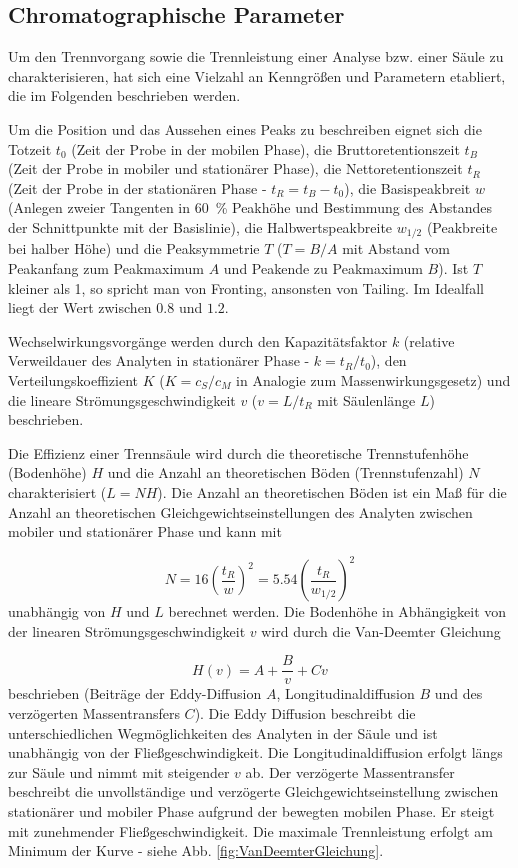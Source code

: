   \subsection{Chromatographische Parameter}
    
    Um den Trennvorgang sowie die Trennleistung einer Analyse bzw. einer Säule zu charakterisieren, hat sich eine Vielzahl an Kenngrößen und Parametern etabliert, die im Folgenden beschrieben werden.
    
    Um die Position und das Aussehen eines Peaks zu beschreiben eignet sich die Totzeit $t_0$ (Zeit der Probe in der mobilen Phase), die Bruttoretentionszeit $t_B$ (Zeit der Probe in mobiler und stationärer Phase), die Nettoretentionszeit $t_R$ (Zeit der Probe in der stationären Phase - $t_R = t_B - t_0$), die Basispeakbreit $w$ (Anlegen zweier Tangenten in \SI[mode=text]{60}{\percent} Peakhöhe und Bestimmung des Abstandes der Schnittpunkte mit der Basislinie), die Halbwertspeakbreite $w_{1/2}$ (Peakbreite bei halber Höhe) und die Peaksymmetrie $T$ ($T = B / A$ mit Abstand vom Peakanfang zum Peakmaximum $A$ und Peakende zu Peakmaximum $B$). Ist $T$ kleiner als 1, so spricht man von Fronting, ansonsten von Tailing. Im Idealfall liegt der Wert zwischen $0.8$ und $1.2$. 
    
    Wechselwirkungsvorgänge werden durch den Kapazitätsfaktor $k$ (relative Verweildauer des Analyten in stationärer Phase - $k = t_R / t_0$), den Verteilungskoeffizient $K$ ($K = c_S / c_M$ in Analogie zum Massenwirkungsgesetz) und die lineare Strömungsgeschwindigkeit $v$ ($v = L / t_R$ mit Säulenlänge $L$) beschrieben. 
    
    Die Effizienz einer Trennsäule wird durch die theoretische Trennstufenhöhe (Bodenhöhe) $H$ und die Anzahl an theoretischen Böden (Trennstufenzahl) $N$ charakterisiert ($L = N H$). Die Anzahl an theoretischen Böden ist ein Maß für die Anzahl an theoretischen Gleichgewichtseinstellungen des Analyten zwischen mobiler und stationärer Phase und kann mit 
    
      \begin{equation}
        N = 16 \left(\frac{t_R}{w}\right)^2 = 5.54 \left(\frac{t_R}{w_{1/2}}\right)^2
      \end{equation} 
    unabhängig von $H$ und $L$ berechnet werden. Die Bodenhöhe in Abhängigkeit von der linearen Strömungsgeschwindigkeit $v$ wird durch die Van-Deemter Gleichung 
    
      \begin{equation}
        H(v) = A + \frac{B}{v} + C v
      \end{equation}
    beschrieben (Beiträge der Eddy-Diffusion $A$, Longitudinaldiffusion $B$ und des verzögerten Massentransfers $C$). Die Eddy Diffusion beschreibt die unterschiedlichen Wegmöglichkeiten des Analyten in der Säule und ist unabhängig von der Fließgeschwindigkeit. Die Longitudinaldiffusion erfolgt längs zur Säule und nimmt mit steigender $v$ ab. Der verzögerte Massentransfer beschreibt die unvollständige und verzögerte Gleichgewichtseinstellung zwischen stationärer und mobiler Phase aufgrund der bewegten mobilen Phase. Er steigt mit zunehmender Fließgeschwindigkeit. Die maximale Trennleistung erfolgt am Minimum der Kurve - siehe Abb. \ref{fig:VanDeemterGleichung}. 
    
